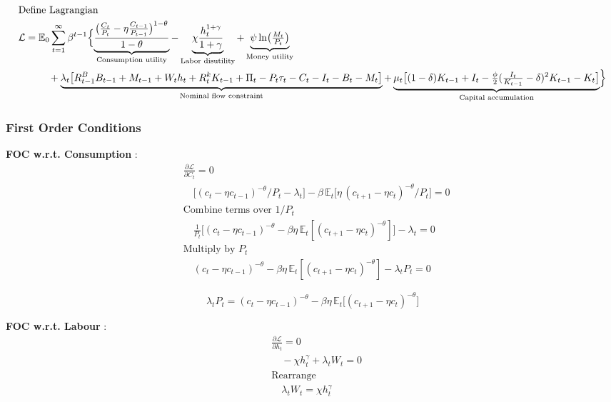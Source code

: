 \documentclass[11pt,preprint]{elsarticle}
\numberwithin{equation}{section}
\numberwithin{figure}{section}
\numberwithin{table}{section}
\begin{document}
\begin{align*}
  & \text{Define Lagrangian} \\
  & \mathcal{L} = \mathbb{E}_0 \sum_{t=1}^{\infty} \beta^{t-1} \Bigl\{
    \underbrace{\frac{\bigl(\tfrac{C_t}{P_t}-\eta\tfrac{C_{t-1}}{P_{t-1}}\bigr)^{1-\theta}}{1-\theta}}_{\text{Consumption utility}}
    - \underbrace{\chi\frac{h_t^{1+\gamma}}{1+\gamma}}_{\text{Labor disutility}}
    + \underbrace{\psi\ln\bigl(\tfrac{M_t}{P_t}\bigr)}_{\text{Money utility}} \\
  & \quad\qquad
    + \underbrace{\lambda_t\bigl[R^B_{t-1}B_{t-1}+M_{t-1}+W_th_t+R^k_tK_{t-1}+\Pi_t-P_t\tau_t-C_t-I_t-B_t-M_t\bigr]}_{\text{Nominal flow constraint}}
    + \underbrace{\mu_t\bigl[(1-\delta)K_{t-1}+I_t-\tfrac{\phi}{2}(\tfrac{I_t}{K_{t-1}}-\delta)^2K_{t-1}-K_t\bigr]}_{\text{Capital accumulation}}
  \Bigr\}
\end{align*}

\subsubsection{\texorpdfstring{First Order Conditions
\label{household_FOC}}{First Order Conditions }}\label{first-order-conditions}

\textbf{FOC w.r.t. Consumption} : \begin{align*}
  & \frac{\partial \mathcal{L}}{\partial C_t} = 0 \\
  & \quad \bigl[(c_t-\eta c_{t-1})^{-\theta}/P_t - \lambda_t\bigr]
    - \beta\,\mathbb{E}_t\bigl[\eta\,(c_{t+1}-\eta c_t)^{-\theta}/P_t\bigr] = 0 \\[6pt]
  & \text{Combine terms over }1/P_t \\
  & \quad \frac{1}{P_t}\bigl[(c_t-\eta c_{t-1})^{-\theta} - \beta\eta\,\mathbb{E}_t[(c_{t+1}-\eta c_t)^{-\theta}]\bigr] - \lambda_t = 0 \\[6pt]
  & \text{Multiply by }P_t \\
  & \quad (c_t-\eta c_{t-1})^{-\theta} - \beta\eta\,\mathbb{E}_t[(c_{t+1}-\eta c_t)^{-\theta}] - \lambda_t P_t = 0
\end{align*}

\begin{equation}\label{foc_C}
\boxed{
  \lambda_t P_t = (c_t-\eta c_{t-1})^{-\theta} - \beta\eta\,\mathbb{E}_t\bigl[(c_{t+1}-\eta c_t)^{-\theta}\bigr]
}
\end{equation}

\textbf{FOC w.r.t. Labour} : \begin{align*}
  & \frac{\partial \mathcal{L}}{\partial h_t} = 0 \\
  & \quad -\chi h_t^{\gamma} + \lambda_t W_t = 0 \\[6pt]
  & \text{Rearrange} \\
  & \quad \lambda_t W_t = \chi h_t^{\gamma}
\end{align*}
\end{document}
